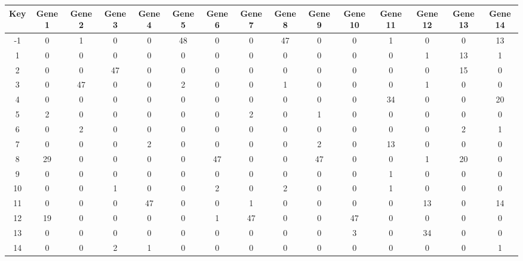 \begin{tabular}{|c|c|c|c|c|c|c|c|c|c|c|c|c|c|c|}
\hline
Key & Gene 1 & Gene 2 & Gene 3 & Gene 4 & Gene 5 & Gene 6 & Gene 7 & Gene 8 & Gene 9 & Gene 10 & Gene 11 & Gene 12 & Gene 13 & Gene 14 \\
\hline
-1 & 0 & 1 & 0 & 0 & 48 & 0 & 0 & 47 & 0 & 0 & 1 & 0 & 0 & 13 \\
1 & 0 & 0 & 0 & 0 & 0 & 0 & 0 & 0 & 0 & 0 & 0 & 1 & 13 & 1 \\
2 & 0 & 0 & 47 & 0 & 0 & 0 & 0 & 0 & 0 & 0 & 0 & 0 & 15 & 0 \\
3 & 0 & 47 & 0 & 0 & 2 & 0 & 0 & 1 & 0 & 0 & 0 & 1 & 0 & 0 \\
4 & 0 & 0 & 0 & 0 & 0 & 0 & 0 & 0 & 0 & 0 & 34 & 0 & 0 & 20 \\
5 & 2 & 0 & 0 & 0 & 0 & 0 & 2 & 0 & 1 & 0 & 0 & 0 & 0 & 0 \\
6 & 0 & 2 & 0 & 0 & 0 & 0 & 0 & 0 & 0 & 0 & 0 & 0 & 2 & 1 \\
7 & 0 & 0 & 0 & 2 & 0 & 0 & 0 & 0 & 2 & 0 & 13 & 0 & 0 & 0 \\
8 & 29 & 0 & 0 & 0 & 0 & 47 & 0 & 0 & 47 & 0 & 0 & 1 & 20 & 0 \\
9 & 0 & 0 & 0 & 0 & 0 & 0 & 0 & 0 & 0 & 0 & 1 & 0 & 0 & 0 \\
10 & 0 & 0 & 1 & 0 & 0 & 2 & 0 & 2 & 0 & 0 & 1 & 0 & 0 & 0 \\
11 & 0 & 0 & 0 & 47 & 0 & 0 & 1 & 0 & 0 & 0 & 0 & 13 & 0 & 14 \\
12 & 19 & 0 & 0 & 0 & 0 & 1 & 47 & 0 & 0 & 47 & 0 & 0 & 0 & 0 \\
13 & 0 & 0 & 0 & 0 & 0 & 0 & 0 & 0 & 0 & 3 & 0 & 34 & 0 & 0 \\
14 & 0 & 0 & 2 & 1 & 0 & 0 & 0 & 0 & 0 & 0 & 0 & 0 & 0 & 1 \\
\hline
\end{tabular}